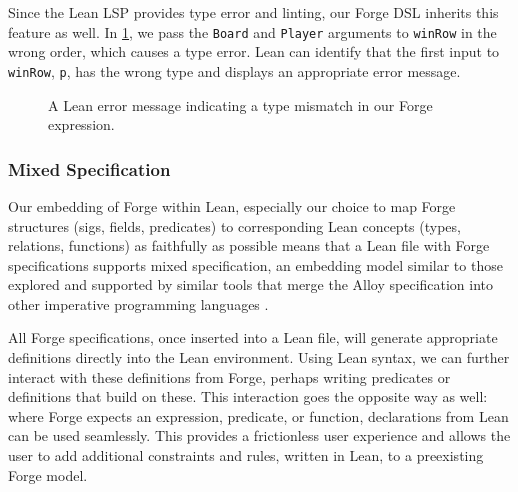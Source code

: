Since the Lean LSP provides type error and linting, our Forge DSL inherits this feature as well. In \cref{fig:sc-type-mismatch}, we pass the \texttt{Board} and \texttt{Player} arguments to \texttt{winRow} in the wrong order, which causes a type error. Lean can identify that the first input to \texttt{winRow}, \texttt{p}, has the wrong type and displays an appropriate error message. 

\begin{figure}[h!]
  \centering
  \caption{A Lean error message indicating a type mismatch in our Forge expression.}
  \label{fig:sc-type-mismatch}
\end{figure}

\subsubsection{Mixed Specification}

Our embedding of Forge within Lean, especially our choice to map Forge structures (sigs, fields, predicates) to corresponding Lean concepts (types, relations, functions) as faithfully as possible means that a Lean file with Forge specifications supports mixed specification, an embedding model similar to those explored and supported by similar tools that merge the Alloy specification into other imperative programming languages \cite{milicevic2010executable,milicevic2014alpha,milicevic2015advancing}. 

All Forge specifications, once inserted into a Lean file, will generate appropriate definitions directly into the Lean environment. Using Lean syntax, we can further interact with these definitions from Forge, perhaps writing predicates or definitions that build on these. This interaction goes the opposite way as well: where Forge expects an expression, predicate, or function, declarations from Lean can be used seamlessly. This provides a frictionless user experience and allows the user to add additional constraints and rules, written in Lean, to a preexisting Forge model. 

